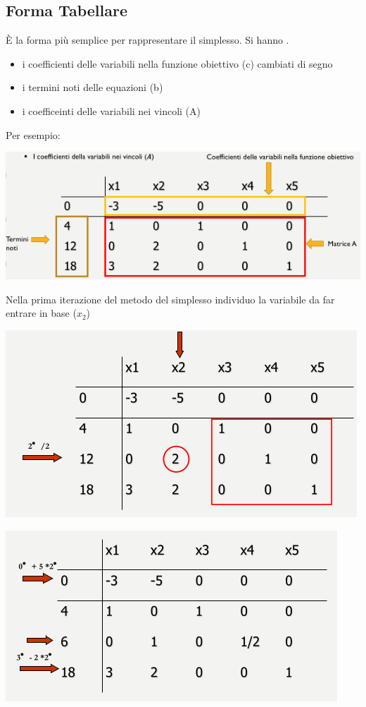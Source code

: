 \documentclass[a4paper,12pt, oneside]{book}
\begin{document}
\subsection{Forma Tabellare}
È la forma più semplice per rappresentare il simplesso. Si hanno .
\begin{itemize}
  \item i coefficienti delle variabili nella funzione obiettivo
  (c) cambiati di segno
  \item i termini noti delle equazioni (b)
  \item i coefficeinti delle variabili nei vincoli (A)
\end{itemize}
\newpage
Per esempio:
\begin{center}
  \includegraphics[scale = 0.8]{img/tab.png}
\end{center}
Nella prima iterazione del metodo del simplesso individuo la variabile
da far entrare in base ($x_2$)
\begin{center}
  \includegraphics[scale = 0.8]{img/tab2.png}
\end{center}
\begin{center}
  \includegraphics[scale = 0.8]{img/tab3.png}
\end{center}
\end{document}
